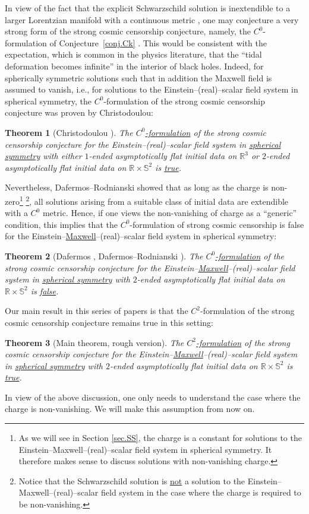 \documentclass[10pt, reqno]{amsart}
\newtheorem{theorem}{Theorem}[section]
\theoremstyle{definition}
\theoremstyle{remark}
\numberwithin{equation}{section}
\newcommand{\0}{\emptyset}
\begin{document}
In view of the fact that the explicit Schwarzschild solution is inextendible to a larger Lorentzian manifold with a continuous metric \cite{Sbie.C0}, one may conjecture a very strong form of the strong cosmic censorship conjecture, namely, the $C^0$-formulation of Conjecture~\ref{conj.Ck} \cite{Chr:CQG}. This would be consistent with the expectation, which is common in the physics literature, that the ``tidal deformation becomes infinite'' in the interior of black holes. Indeed, for spherically symmetric solutions such that in addition the Maxwell field is assumed to vanish, i.e., for solutions to the Einstein--(real)--scalar field system in spherical symmetry, the $C^0$-formulation of the strong cosmic censorship conjecture was proven by Christodoulou:
\begin{theorem}[Christodoulou \cite{Christodoulou:1991yfa, Chr.instab}]
The \underline{$C^0$-formulation} of the strong cosmic censorship conjecture for the Einstein--(real)--scalar field system in \underline{spherical symmetry} with either $1$-ended asymptotically flat initial data on $\mathbb R^3$ or $2$-ended asymptotically flat initial data on $\mathbb R\times \mathbb S^2$ is \underline{true}.
\end{theorem}
Nevertheless, Dafermos--Rodnianski showed that as long as the charge is non-zero\footnote{As we will see in Section \ref{sec.SS}, the charge is a constant for solutions to the Einstein--Maxwell--(real)--scalar field system in spherical symmetry. It therefore makes sense to discuss solutions with non-vanishing charge.} \footnote{Notice that the Schwarzschild solution is \underline{not} a solution to the Einstein--Maxwell--(real)--scalar field system in the case where the charge is required to be non-vanishing.}, all solutions arising from a suitable class of initial data are extendible with a $C^0$ metric. Hence, if one views the non-vanishing of charge as a ``generic'' condition, this implies that the $C^0$-formulation of strong cosmic censorship is false for the Einstein--\underline{Maxwell}--(real)--scalar field system in spherical symmetry:
\begin{theorem}[Dafermos \cite{D2}, Dafermos--Rodnianski \cite{DRPL}]\label{DDR}
The \underline{$C^0$-formulation} of the strong cosmic censorship conjecture for the Einstein--\underline{Maxwell}--(real)--scalar field system in \underline{spherical symmetry} with $2$-ended asymptotically flat initial data on $\mathbb R\times \mathbb S^2$ is \underline{false}.
\end{theorem}
Our main result in this series of papers is that the $C^2$-formulation of the strong cosmic censorship conjecture remains true in this setting:
\begin{theorem}[Main theorem, rough version]\label{main.theorem.both}
The \underline{$C^2$-formulation} of the strong cosmic censorship conjecture for the Einstein--\underline{Maxwell}--(real)--scalar field system in \underline{spherical symmetry} with $2$-ended asymptotically flat initial data on $\mathbb R\times \mathbb S^2$ is \underline{true}.
\end{theorem}
In view of the above discussion, one only needs to understand the case where the charge is non-vanishing. We will make this assumption from now on.
\end{document}
